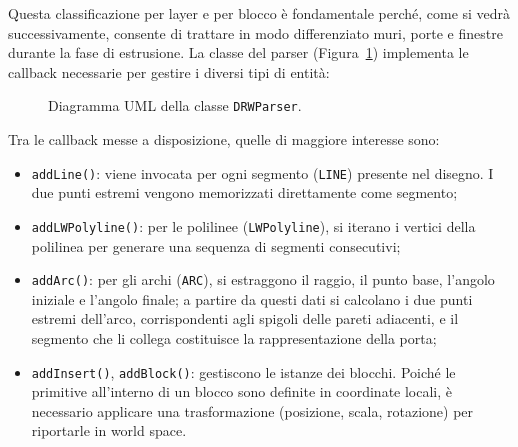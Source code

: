 Questa classificazione per layer e per blocco è fondamentale perché, come si vedrà successivamente, consente di trattare in modo differenziato muri, porte e finestre durante la fase di estrusione. La classe del parser (Figura~\ref{fig:drwparser-uml}) implementa le callback necessarie per gestire i diversi tipi di entità:
\begin{figure}[H]
	\centering
	\caption{Diagramma UML della classe \texttt{DRWParser}.}
	\label{fig:drwparser-uml}
\end{figure}


Tra le callback messe a disposizione, quelle di maggiore interesse sono:
\begin{itemize}
	\item \texttt{addLine()}: viene invocata per ogni segmento (\texttt{LINE}) presente nel disegno. I due punti estremi vengono memorizzati direttamente come segmento;
	
	\item \texttt{addLWPolyline()}: per le polilinee (\texttt{LWPolyline}), si iterano i vertici della polilinea per generare una sequenza di segmenti consecutivi;
	
	\item \texttt{addArc()}: per gli archi (\texttt{ARC}), si estraggono il raggio, il punto base, l'angolo iniziale e l'angolo finale; a partire da questi dati si calcolano i due punti estremi dell'arco, corrispondenti agli spigoli delle pareti adiacenti, e il segmento che li collega costituisce la rappresentazione della porta;
	
	\item \texttt{addInsert()}, \texttt{addBlock()}: gestiscono le istanze dei blocchi. Poiché le primitive all'interno di un blocco sono definite in coordinate locali, è necessario applicare una trasformazione (posizione, scala, rotazione) per riportarle in world space.
\end{itemize}

